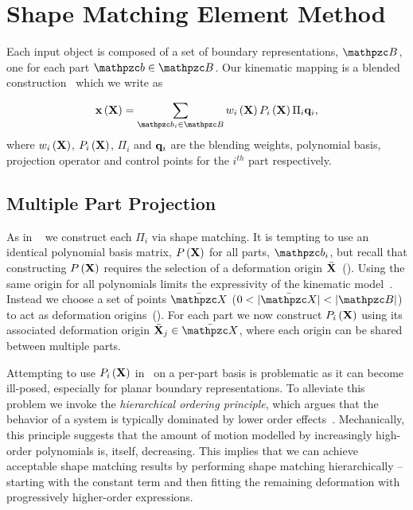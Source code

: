 \section{Shape Matching Element Method}
 Each input object is composed of a set of boundary representations, $\Prts$, one for each part $\prt\in\Prts$. 
 Our kinematic mapping is a blended construction~\cite{10.1145/2614028.2615427,blendedFORKS2016} which we write as

 \begin{equation}
    \defX\left(\refX\right) = \sum_{\prt_i\in\Prts} \bldxi\Pmatxi\Pi_i\vc{q}_i, 
    \label{eq:kinematics}
 \end{equation} where $w_i\left(\mathbf{X}\right)$, $P_i\left(\mathbf{X} \right)$, $\Pi_i$ and $\mathbf{q}_i$ are the blending weights, polynomial basis, projection operator and control points for the $i^{th}$
 part respectively.  
 
 \subsection*{Multiple Part Projection}
As in ~ we construct each $\Pi_i$ via shape matching. 
It is tempting to use an identical polynomial basis matrix, $P\left(\mathbf{X}\right)$ for all parts, $\prt_i$, but recall that constructing $P\left(\mathbf{X}\right)$ requires the selection of a deformation
origin $\bar{\mathbf{X}}$~(). 
Using the same origin for all polynomials limits the expressivity of the kinematic model~\cite{STBS:2011}.
Instead we choose a set of points $\XBs$ ($0 < |\XBs| < |\Prts|$) to act as deformation origins~().
For each part we now construct $P_i\left(\mathbf{X} \right)$ using its associated deformation origin $\bar{\refX}_j\in \XBs$, where each origin can
be shared between multiple parts.

Attempting to use $P_i\left(\mathbf{X} \right)$ in~ on a per-part basis is problematic as it can become ill-posed, especially for planar boundary representations. 
To alleviate this problem we invoke the \emph{hierarchical ordering principle}, which argues that the behavior of a system is typically 
dominated by lower order effects~\cite{li2006regularities}. 
Mechanically, this principle suggests that the amount of motion modelled by increasingly high-order polynomials is, itself, decreasing. 
This implies that we can achieve acceptable shape matching results by performing shape matching hierarchically -- starting with the constant term and then 
fitting the remaining deformation with progressively higher-order expressions. 

